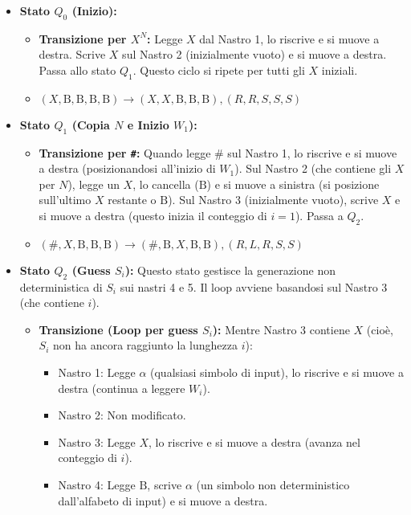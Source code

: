 \documentclass[a4paper]{article}
\newcommand{\B}{\text{B}} %
\newcommand{\alphaSym}{\alpha} %
\begin{document}
\begin{itemize}
    \item \textbf{Stato $Q_0$ (Inizio):}
        \begin{itemize}
            \item \textbf{Transizione per $X^N$:} Legge $X$ dal Nastro 1, lo riscrive e si muove a destra. Scrive $X$ sul Nastro 2 (inizialmente vuoto) e si muove a destra. Passa allo stato $Q_1$. Questo ciclo si ripete per tutti gli $X$ iniziali.
            \item $(X, \B, \B, \B, \B) \to (X, X, \B, \B, \B), (R,R,S,S,S)$
        \end{itemize}
    \item \textbf{Stato $Q_1$ (Copia $N$ e Inizio $W_1$):}
        \begin{itemize}
            \item \textbf{Transizione per \texttt{\#}:} Quando legge $\#$ sul Nastro 1, lo riscrive e si muove a destra (posizionandosi all'inizio di $W_1$). Sul Nastro 2 (che contiene gli $X$ per $N$), legge un $X$, lo cancella ($\B$) e si muove a sinistra (si posizione sull'ultimo $X$ restante o $\B$). Sul Nastro 3 (inizialmente vuoto), scrive $X$ e si muove a destra (questo inizia il conteggio di $i=1$). Passa a $Q_2$.
            \item $(\#, X, \B, \B, \B) \to (\#, \B, X, \B, \B), (R,L,R,S,S)$
        \end{itemize}
    \item \textbf{Stato $Q_2$ (Guess $S_i$):}
        Questo stato gestisce la generazione non deterministica di $S_i$ sui nastri 4 e 5. Il loop avviene basandosi sul Nastro 3 (che contiene $i$).
        \begin{itemize}
            \item \textbf{Transizione (Loop per guess $S_i$):}
                Mentre Nastro 3 contiene $X$ (cioè, $S_i$ non ha ancora raggiunto la lunghezza $i$):
                \begin{itemize}
                    \item Nastro 1: Legge $\alpha$ (qualsiasi simbolo di input), lo riscrive e si muove a destra (continua a leggere $W_i$).
                    \item Nastro 2: Non modificato.
                    \item Nastro 3: Legge $X$, lo riscrive e si muove a destra (avanza nel conteggio di $i$).
                    \item Nastro 4: Legge $\B$, scrive $\alphaSym$ (un simbolo non deterministico dall'alfabeto di input) e si muove a destra.

\end{itemize}
\end{itemize}
\end{itemize}
\end{document}
